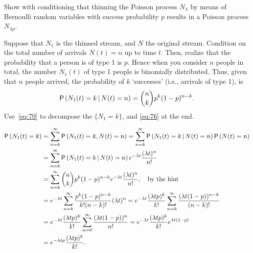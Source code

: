 \begin{exercise}{\faCalculator}\label{ex:1}
  Show with conditioning that thinning the Poisson process $N_\lambda$ by means of Bernoulli random variables with success probability $p$ results in a Poisson process $N_{\lambda p}$.
  \begin{hint}
Suppose that  $N_1$ is the  thinned stream, and $N$ the original stream.  Condition on the total number of arrivals $N(t)=n$ up to time
      $t$. Then, realize that the probability that a person is of type 1 is $p$. Hence when you consider $n$ people in
      total, the number $N_1(t)$ of type 1 people is binomially distributed. Thus, given that $n$ people arrived, the probability of $k$ `successes' (i.e., arrivals of type 1), is 
      \begin{equation*}
        \P{N_1(t)=k \given N(t) = n} = {n \choose k} p^k (1-p)^{n-k}.
      \end{equation*}
Use~\eqref{eq:70} to decompose the $\{N_1=k\}$, and \eqref{eq:76} at the end. 
\end{hint}
\begin{solution}
\begin{align*}
    \P{N_1(t) = k}
&= \sum_{n=k}^\infty \P{N_1(t) =k, N(t) = n} 
= \sum_{n=k}^\infty \P{N_1(t) =k\given N(t) = n}\P{N(t)=n} \\
&= \sum_{n=k}^\infty \P{N_1(t) =k\given N(t) = n}e^{-\lambda t} \frac{(\lambda t)^n}{n!}\\
&= \sum_{n=k}^\infty {n \choose k} p^k (1-p)^{n-k} e^{-\lambda t} \frac{(\lambda t)^n}{n!}, \quad\text{by the hint}\\
&= e^{-\lambda t}\sum_{n=k}^\infty  \frac{p^k (1-p)^{n-k}}{k! (n-k)!} (\lambda t)^n
= e^{-\lambda t} \frac{(\lambda t p)^k}{k!} \sum_{n=k}^\infty  \frac{(\lambda t (1-p))^{n-k}}{(n-k)!}\\
&= e^{-\lambda t} \frac{(\lambda  t p)^k}{k!} \sum_{n=0}^\infty  \frac{(\lambda t (1-p))^{n}}{n!}
= e^{-\lambda t} \frac{(\lambda t p)^k}{k!} e^{\lambda t(1-p)} \\
&= e^{-\lambda t p} \frac{(\lambda t p)^k}{k!}.
\end{align*}
\end{solution}
\end{exercise}    


